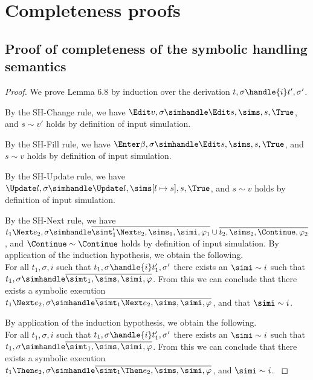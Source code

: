 

\section{Completeness proofs}
\label{sec:completeness-proofs}

\subsection{Proof of completeness of the symbolic handling semantics}
\begin{proof}

  We prove Lemma 6.8 by induction over the derivation $t,\sigma\handle{i}t',\sigma'$.

  {
  By the SH-Change rule, we have $\Edit v,\sigma\simhandle\Edit s,\sims,s,\True$, and $s\sim v'$ holds by definition of input simulation.
  }

  {
    By the SH-Fill rule, we have $\Enter \beta ,\sigma\simhandle\Edit s,\sims,s,\True$, and $s\sim v$ holds by definition of input simulation.
  }

  {
    By the SH-Update rule, we have $\Update l,\sigma\simhandle\Update l ,\sims[l\mapsto s],s,\True$, and $s\sim v$ holds by definition of input simulation.
   }


    {
      By the SH-Next rule, we have $t_1\Next e_2,\sigma\simhandle\overline{\simt_1'\Next e_2,\sims_1,\simi,\phi_1}\cup\overline{t_2,\sims_2,\Continue,\phi_2}$, and $\Continue \sim \Continue$ holds by definition of input simulation.
    }
    {
    By application of the induction hypothesis, we obtain the following.\\
    For all $t_1,\sigma,i$ such that $t_1,\sigma\handle{i}t_1',\sigma'$ there exists an $\simi\sim i$ such that $t_1,\sigma\simhandle\overline{\simt_1,\sims,\simi,\phi}$.
    From this we can conclude that there exists a symbolic execution $t_1\Next e_2,\sigma\simhandle \overline{\simt_1\Next e_2,\sims,\simi,\phi}$, and that $\simi\sim i$.
    }



  {
  By application of the induction hypothesis, we obtain the following.\\
  For all $t_1,\sigma,i$ such that $t_1,\sigma\handle{i}t_1',\sigma'$ there exists an $\simi\sim i$ such that $t_1,\sigma\simhandle \overline{\simt_1,\sims,\simi,\phi}$.
  From this we can conclude that there exists a symbolic execution $t_1\Then e_2,\sigma\simhandle \overline{\simt_1\Then e_2,\sims,\simi,\phi}$, and $\simi\sim i$.
  }



\end{proof}

